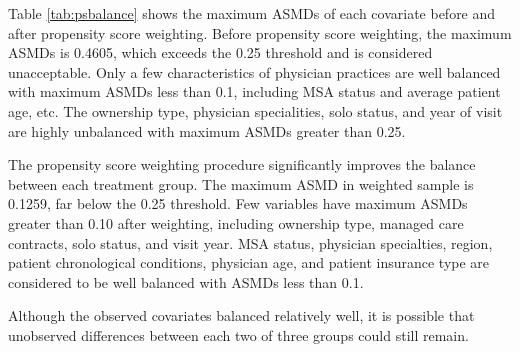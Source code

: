 \documentclass[12pt]{report}
\begin{document}
Table \ref{tab:psbalance} shows the maximum ASMDs of each covariate before and after propensity score weighting. Before propensity score weighting, the maximum ASMDs is 0.4605, which exceeds the 0.25 threshold and is considered unacceptable. Only a few characteristics of physician practices are well balanced with maximum ASMDs less than 0.1, including MSA status and average patient age, etc. The ownership type, physician specialities, solo status, and year of visit are highly unbalanced with maximum ASMDs greater than 0.25. 

The propensity score weighting procedure significantly improves the balance between each treatment group. The maximum ASMD in weighted sample is 0.1259, far below the 0.25 threshold. Few variables have maximum ASMDs greater than 0.10 after weighting, including ownership type, managed care contracts, solo status, and visit year. MSA status, physician specialties, region, patient chronological conditions, physician age, and patient insurance type are considered to be well balanced with ASMDs less than 0.1.



Although the observed covariates balanced relatively well, it is possible that unobserved differences between each two of three groups could still remain.
\end{document}
